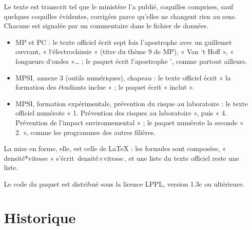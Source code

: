 \documentclass[a4paper,11pt]{article}
\begin{document}
Le texte est transcrit tel que le ministère l'a publié, coquilles comprises,
sauf quelques coquilles évidentes, corrigées parce qu'elles ne changent rien au
sens. Chacune est signalée par un commentaire dans le fichier de données.
\begin{itemize}
  \item MP et PC : le texte officiel écrit sept fois l'apostrophe avec un
    guillemet ouvrant, « l‘électrochimie » (titre du thème 9 de MP), « Van ‘t
    Hoff », « longueurs d‘ondes »… ; le paquet écrit l'apostrophe ’, comme
    partout ailleurs.
  \item MPSI, annexe 3 (outils numériques), chapeau : le texte officiel écrit « la
    formation des étudiants inclue » ; le paquet écrit « inclut ».
  \item MPSI, formation expérimentale, prévention du risque au laboratoire : le texte
    officiel numérote « 1. Prévention des risques au laboratoire », puis « 4.
    Prévention de l'impact environnemental » ; le paquet numérote la seconde
    « 2. », comme les programmes des autres filières.
\end{itemize}
La mise en forme, elle, est celle de \LaTeX{} : les formules sont composées,
« densité*vitesse » s'écrit $\text{densité}\times\text{vitesse}$, et une liste
du texte officiel reste une liste.

Le code du paquet est distribué sous la licence LPPL, version 1.3c ou
ultérieure.

\section{Historique}
\end{document}
